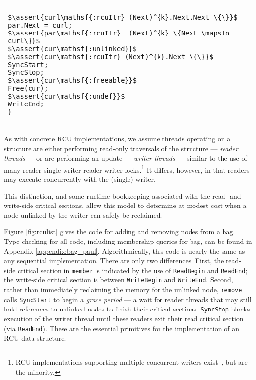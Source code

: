 \begin{figure*}[t!]
\begin{tabular}{p{}p{}}
\begin{lstlisting}[basicstyle=\scriptsize\ttfamily]
$\assert{curl\mathsf{:rcuItr} (Next)^{k}.Next.Next \{\}}$
par.Next = curl;
$\assert{par\mathsf{:rcuItr}  (Next)^{k} \{Next \mapsto curl\}}$
$\assert{cur\mathsf{:unlinked}}$
$\assert{cur\mathsf{:rcuItr} (Next)^{k}.Next \{\}}$
SyncStart;
SyncStop;
$\assert{cur\mathsf{:freeable}}$
Free(cur);
$\assert{cur\mathsf{:undef}}$
WriteEnd;
}
\end{lstlisting}
\end{tabular}
\vspace{-2em}
\caption{Read-Copy-Update Client: Linked-List based Bag Implementation.}
\label{fig:rculist}
\end{figure*}

As with concrete RCU implementations, we assume threads operating on a structure are either performing read-only traversals of the structure --- \emph{reader threads} --- or are performing an update --- \emph{writer threads} --- similar to the use of many-reader single-writer reader-writer locks.\footnote{RCU implementations supporting multiple concurrent writers exist~\cite{Arbel:2014:CUR:2611462.2611471}, but are the minority.}  It differs, however, in that readers may execute concurrently with the (single) writer.

This distinction, and some runtime bookkeeping associated with the read- and write-side critical sections, allow this model to determine at modest cost when a node unlinked by the writer can safely be reclaimed.

Figure \ref{fig:rculist} gives the code for adding and removing nodes from a bag. Type checking for all code, including membership queries for bag, can be found in Appendix \ref{appendix:bag_paul}. Algorithmically, this code is nearly the same as any sequential implementation. There are only two differences.
First, the read-side critical section in \texttt{member} is indicated by the use of \lstinline|ReadBegin| and \lstinline|ReadEnd|; the write-side critical section is between \lstinline|WriteBegin| and \lstinline|WriteEnd|.
Second, rather than immediately reclaiming the memory for the unlinked node, \texttt{remove} calls \lstinline|SyncStart| to begin a \emph{grace period} --- a wait for reader threads that may still hold references to unlinked nodes to finish their critical sections.
 \lstinline|SyncStop| blocks execution of the writer thread until these readers exit their read critical section (via \lstinline|ReadEnd|). These are the essential primitives for the implementation of an RCU data structure.


